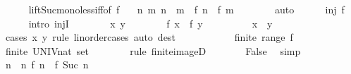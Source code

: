 \begin{isabellebody}
\ \ \ \ \isamarkupfalse%
\ lift{\isacharunderscore}{\kern0pt}Suc{\isacharunderscore}{\kern0pt}mono{\isacharunderscore}{\kern0pt}less{\isacharunderscore}{\kern0pt}iff{\isacharbrackleft}{\kern0pt}of\ f{\isacharbrackright}{\kern0pt}\ \isamarkupfalse%
\ {\isacharasterisk}{\kern0pt}{\isacharcolon}{\kern0pt}\ {\isachardoublequoteopen}{\isasymAnd}n\ m{\isachardot}{\kern0pt}\ n\ {\isacharless}{\kern0pt}\ m\ {\isasymLongrightarrow}\ f\ n\ {\isacharless}{\kern0pt}\ f\ m{\isachardoublequoteclose}\isanewline
\ \ \ \ \ \ \isamarkupfalse%
\ auto\isanewline
\ \ \ \ \isamarkupfalse%
\ {\isachardoublequoteopen}inj\ f{\isachardoublequoteclose}\isanewline
\ \ \ \ \isamarkupfalse%
\ {\isacharparenleft}{\kern0pt}intro\ injI{\isacharparenright}{\kern0pt}\isanewline
\ \ \ \ \ \ \isamarkupfalse%
\ x\ y\isanewline
\ \ \ \ \ \ \isamarkupfalse%
\ {\isachardoublequoteopen}f\ x\ {\isacharequal}{\kern0pt}\ f\ y{\isachardoublequoteclose}\isanewline
\ \ \ \ \ \ \isamarkupfalse%
\ \isamarkupfalse%
\ {\isachardoublequoteopen}x\ {\isacharequal}{\kern0pt}\ y{\isachardoublequoteclose}\isanewline
\ \ \ \ \ \ \ \ \isamarkupfalse%
\ {\isacharparenleft}{\kern0pt}cases\ x\ y\ rule{\isacharcolon}{\kern0pt}\ linorder{\isacharunderscore}{\kern0pt}cases{\isacharparenright}{\kern0pt}\ {\isacharparenleft}{\kern0pt}auto\ dest{\isacharcolon}{\kern0pt}\ {\isacharasterisk}{\kern0pt}{\isacharparenright}{\kern0pt}\isanewline
\ \ \ \ \isamarkupfalse%
\isanewline
\ \ \ \ \isamarkupfalse%
\ {\isacartoucheopen}finite\ {\isacharparenleft}{\kern0pt}range\ f{\isacharparenright}{\kern0pt}{\isacartoucheclose}\ \isamarkupfalse%
\ {\isachardoublequoteopen}finite\ {\isacharparenleft}{\kern0pt}UNIV{\isacharcolon}{\kern0pt}{\isacharcolon}{\kern0pt}nat\ set{\isacharparenright}{\kern0pt}{\isachardoublequoteclose}\isanewline
\ \ \ \ \ \ \isamarkupfalse%
\ {\isacharparenleft}{\kern0pt}rule\ finite{\isacharunderscore}{\kern0pt}imageD{\isacharparenright}{\kern0pt}\isanewline
\ \ \ \ \isamarkupfalse%
\ \isamarkupfalse%
\ False\ \isamarkupfalse%
\ simp\isanewline
\ \ \isamarkupfalse%
\isanewline
\ \ \isamarkupfalse%
\ \isamarkupfalse%
\ n\ \ n{\isacharcolon}{\kern0pt}\ {\isachardoublequoteopen}f\ n\ {\isacharequal}{\kern0pt}\ f\ {\isacharparenleft}{\kern0pt}Suc\ n{\isacharparenright}{\kern0pt}{\isachardoublequoteclose}\ \isacommand{{\isachardot}{\kern0pt}{\isachardot}{\kern0pt}}\isamarkupfalse%

\end{isabellebody}

